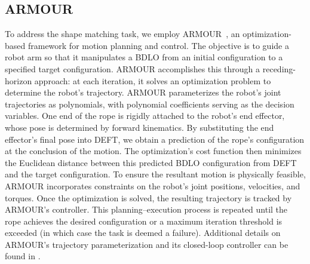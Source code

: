 \subsection{ARMOUR}
\label{armour_appendix}



To address the shape matching task, we employ ARMOUR \cite{ARMOUR}, an optimization-based framework for motion planning and control. 
The objective is to guide a robot arm so that it manipulates a BDLO from an initial configuration to a specified target configuration. 
ARMOUR accomplishes this through a receding-horizon approach: at each iteration, it solves an optimization problem to determine the robot’s trajectory.
ARMOUR parameterizes the robot’s joint trajectories as polynomials, with polynomial coefficients serving as the decision variables. 
One end of the rope is rigidly attached to the robot’s end effector, whose pose is determined by forward kinematics. 
By substituting the end effector’s final pose into DEFT, we obtain a prediction of the rope’s configuration at the conclusion of the motion. 
The optimization’s cost function then minimizes the Euclidean distance between this predicted BDLO configuration from DEFT and the target configuration.
To ensure the resultant motion is physically feasible, ARMOUR incorporates constraints on the robot’s joint positions, velocities, and torques. 
Once the optimization is solved, the resulting trajectory is tracked by ARMOUR’s controller.
This planning–execution process is repeated until the rope achieves the desired configuration or a maximum iteration threshold is exceeded (in which case the task is deemed a failure).
Additional details on ARMOUR’s trajectory parameterization and its closed-loop controller can be found in \cite[Section IX]{ARMOUR}. 
